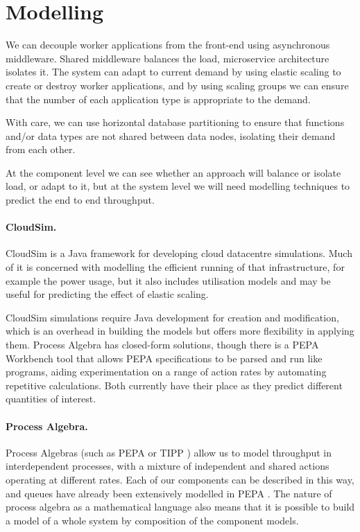 \section{Modelling}

We can decouple worker applications from the front-end using asynchronous middleware.  Shared middleware balances the load, microservice architecture isolates it.  The system can adapt to current demand by using elastic scaling to create or destroy worker applications, and by using scaling groups we can ensure that the number of each application type is appropriate to the demand.

With care, we can use horizontal database partitioning to ensure that functions and/or data types are not shared between data nodes, isolating their demand from each other.

At the component level we can see whether an approach will balance or isolate load, or adapt to it, but at the system level we will need modelling techniques to predict the end to end throughput.

\paragraph{CloudSim.}  CloudSim \cite{RN69} is a Java framework for developing cloud datacentre simulations.  Much of it is concerned with modelling the efficient running of that infrastructure, for example the power usage, but it also includes utilisation models and may be useful for predicting the effect of elastic scaling.

CloudSim simulations require Java development for creation and modification, which is an overhead in building the models but offers more flexibility in applying them.  Process Algebra has closed-form solutions, though there is a PEPA Workbench tool \cite{RN51} that allows PEPA specifications to be parsed and run like programs, aiding experimentation on a range of action rates by automating repetitive calculations.  Both currently have their place as they predict different quantities of interest.

\paragraph{Process Algebra.} Process Algebras (such as PEPA or TIPP \cite{RN64}) allow us to model throughput in interdependent processes, with a mixture of independent and shared actions operating at different rates.  Each of our components can be described in this way, and queues have already been extensively modelled in PEPA \cite{RN75}.  The nature of process algebra as a mathematical language also means that it is possible to build a model of a whole system by composition of the component models.

